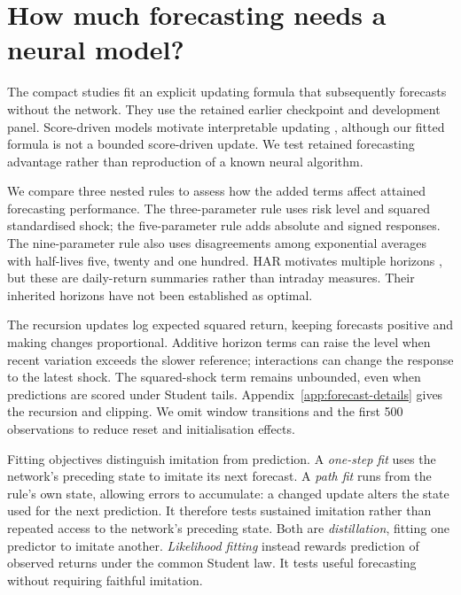 \FloatBarrier

\section{How much forecasting needs a neural model?}
\label{sec:compact-rule}

The compact studies fit an explicit updating formula that subsequently forecasts without the network. They use the retained earlier checkpoint and development panel. Score-driven models motivate interpretable updating \citep{creal2013generalized,harvey2013dynamic}, although our fitted formula is not a bounded score-driven update. We test retained forecasting advantage rather than reproduction of a known neural algorithm.

We compare three nested rules to assess how the added terms affect attained forecasting performance. The three-parameter rule uses risk level and squared standardised shock; the five-parameter rule adds absolute and signed responses. The nine-parameter rule also uses disagreements among exponential averages with half-lives five, twenty and one hundred. HAR motivates multiple horizons \citep{corsi2009simple}, but these are daily-return summaries rather than intraday measures. Their inherited horizons have not been established as optimal.

The recursion updates log expected squared return, keeping forecasts positive and making changes proportional. Additive horizon terms can raise the level when recent variation exceeds the slower reference; interactions can change the response to the latest shock. The squared-shock term remains unbounded, even when predictions are scored under Student tails. Appendix~\ref{app:forecast-details} gives the recursion and clipping. We omit window transitions and the first 500 observations to reduce reset and initialisation effects.

Fitting objectives distinguish imitation from prediction. A \emph{one-step fit} uses the network's preceding state to imitate its next forecast. A \emph{path fit} runs from the rule's own state, allowing errors to accumulate: a changed update alters the state used for the next prediction. It therefore tests sustained imitation rather than repeated access to the network's preceding state. Both are \emph{distillation}, fitting one predictor to imitate another. \emph{Likelihood fitting} instead rewards prediction of observed returns under the common Student law. It tests useful forecasting without requiring faithful imitation.

